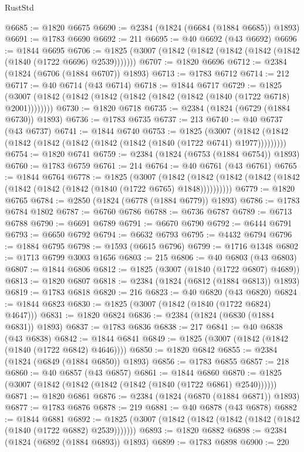 \begin{lexlean}{RustStd}
\begin{coremodule}
@6685 := @1820 @6675
@6690 := @2384 (@1824 (@6684 (@1884 @6685)) @1893)
@6691 := @1783 @6690
@6692 := 211
@6695 := @40 @6692 (@43 @6692)
@6696 := @1844 @6695
@6706 := @1825 (@3007 (@1842 (@1842 (@1842 (@1842 (@1842 (@1840 (@1722 @6696) @2539)))))))
@6707 := @1820 @6696
@6712 := @2384 (@1824 (@6706 (@1884 @6707)) @1893)
@6713 := @1783 @6712
@6714 := 212
@6717 := @40 @6714 (@43 @6714)
@6718 := @1844 @6717
@6729 := @1825 (@3007 (@1842 (@1842 (@1842 (@1842 (@1842 (@1842 (@1840 (@1722 @6718) @2001))))))))
@6730 := @1820 @6718
@6735 := @2384 (@1824 (@6729 (@1884 @6730)) @1893)
@6736 := @1783 @6735
@6737 := 213
@6740 := @40 @6737 (@43 @6737)
@6741 := @1844 @6740
@6753 := @1825
    (@3007 (@1842 (@1842 (@1842 (@1842 (@1842 (@1842 (@1842 (@1840 (@1722 @6741) @1977)))))))))
@6754 := @1820 @6741
@6759 := @2384 (@1824 (@6753 (@1884 @6754)) @1893)
@6760 := @1783 @6759
@6761 := 214
@6764 := @40 @6761 (@43 @6761)
@6765 := @1844 @6764
@6778 := @1825
    (@3007
      (@1842 (@1842 (@1842 (@1842 (@1842 (@1842 (@1842 (@1842 (@1840 (@1722 @6765) @1848))))))))))
@6779 := @1820 @6765
@6784 := @2850 (@1824 (@6778 (@1884 @6779)) @1893)
@6786 := @1783 @6784 @1802
@6787 := @6760 @6786
@6788 := @6736 @6787
@6789 := @6713 @6788
@6790 := @6691 @6789
@6791 := @6670 @6790
@6792 := @6444 @6791
@6793 := @6650 @6792
@6794 := @6632 @6793
@6795 := @4432 @6794
@6796 := @1884 @6795
@6798 := @1593 (@6615 @6796)
@6799 := @1716 @1348
@6802 := @1713 @6799 @3003 @1656
@6803 := 215
@6806 := @40 @6803 (@43 @6803)
@6807 := @1844 @6806
@6812 := @1825 (@3007 (@1840 (@1722 @6807) @4689))
@6813 := @1820 @6807
@6818 := @2384 (@1824 (@6812 (@1884 @6813)) @1893)
@6819 := @1783 @6818
@6820 := 216
@6823 := @40 @6820 (@43 @6820)
@6824 := @1844 @6823
@6830 := @1825 (@3007 (@1842 (@1840 (@1722 @6824) @4647)))
@6831 := @1820 @6824
@6836 := @2384 (@1824 (@6830 (@1884 @6831)) @1893)
@6837 := @1783 @6836
@6838 := 217
@6841 := @40 @6838 (@43 @6838)
@6842 := @1844 @6841
@6849 := @1825 (@3007 (@1842 (@1842 (@1840 (@1722 @6842) @4646))))
@6850 := @1820 @6842
@6855 := @2384 (@1824 (@6849 (@1884 @6850)) @1893)
@6856 := @1783 @6855
@6857 := 218
@6860 := @40 @6857 (@43 @6857)
@6861 := @1844 @6860
@6870 := @1825 (@3007 (@1842 (@1842 (@1842 (@1842 (@1840 (@1722 @6861) @2540))))))
@6871 := @1820 @6861
@6876 := @2384 (@1824 (@6870 (@1884 @6871)) @1893)
@6877 := @1783 @6876
@6878 := 219
@6881 := @40 @6878 (@43 @6878)
@6882 := @1844 @6881
@6892 := @1825 (@3007 (@1842 (@1842 (@1842 (@1842 (@1842 (@1840 (@1722 @6882) @2539)))))))
@6893 := @1820 @6882
@6898 := @2384 (@1824 (@6892 (@1884 @6893)) @1893)
@6899 := @1783 @6898
@6900 := 220

\end{coremodule}
\end{lexlean}
